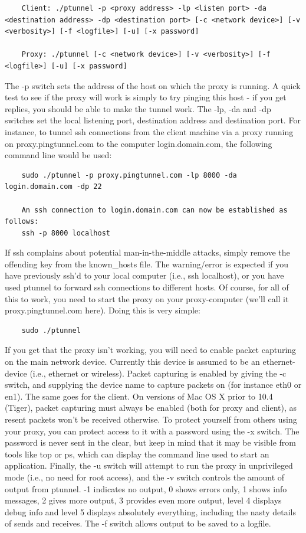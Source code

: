 \begin{lstlisting}
    Client: ./ptunnel -p <proxy address> -lp <listen port> -da <destination address> -dp <destination port> [-c <network device>] [-v <verbosity>] [-f <logfile>] [-u] [-x password]
    
    Proxy: ./ptunnel [-c <network device>] [-v <verbosity>] [-f <logfile>] [-u] [-x password]
\end{lstlisting}
The -p switch sets the address of the host on which the proxy is running. A quick test to see if the proxy will work is simply to try pinging this host - if you get replies, you should be able to make the tunnel work.
The -lp, -da and -dp switches set the local listening port, destination address and destination port. For instance, to tunnel ssh connections from the client machine via a proxy running on proxy.pingtunnel.com to the computer login.domain.com, the following command line would be used:
\begin{lstlisting}
    sudo ./ptunnel -p proxy.pingtunnel.com -lp 8000 -da login.domain.com -dp 22

    An ssh connection to login.domain.com can now be established as follows:
    ssh -p 8000 localhost
\end{lstlisting}
If ssh complains about potential man-in-the-middle attacks, simply remove the offending key from the known_hosts file. The warning/error is expected if you have previously ssh'd to your local computer (i.e., ssh localhost), or you have used ptunnel to forward ssh connections to different hosts.
Of course, for all of this to work, you need to start the proxy on your proxy-computer (we'll call it proxy.pingtunnel.com here). Doing this is very simple:
\begin{lstlisting}
    sudo ./ptunnel
\end{lstlisting}
If you get that the proxy isn't working, you will need to enable packet capturing on the main network device. Currently this device is assumed to be an ethernet-device (i.e., ethernet or wireless). Packet capturing is enabled by giving the -c switch, and supplying the device name to capture packets on (for instance eth0 or en1). The same goes for the client. On versions of Mac OS X prior to 10.4 (Tiger), packet capturing must always be enabled (both for proxy and client), as resent packets won't be received otherwise.
To protect yourself from others using your proxy, you can protect access to it with a password using the -x switch. The password is never sent in the clear, but keep in mind that it may be visible from tools like top or ps, which can display the command line used to start an application.
Finally, the -u switch will attempt to run the proxy in unprivileged mode (i.e., no need for root access), and the -v switch controls the amount of output from ptunnel. -1 indicates no output, 0 shows errors only, 1 shows info messages, 2 gives more output, 3 provides even more output, level 4 displays debug info and level 5 displays absolutely everything, including the nasty details of sends and receives. The -f switch allows output to be saved to a logfile.


